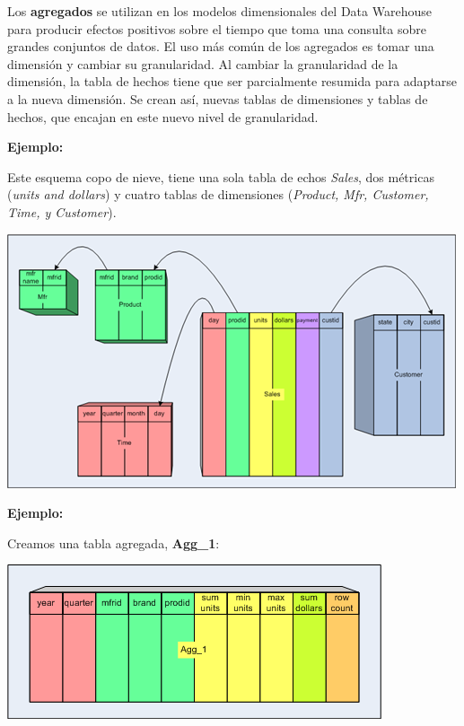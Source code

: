 \documentclass{fancyslides}
\begin{document}
\begin{frame}
\end{frame}

\begin{frame}
\misc
{
Los \textbf{agregados} se utilizan en los modelos dimensionales del Data Warehouse para producir efectos positivos sobre el tiempo que toma una consulta sobre grandes conjuntos de datos. El uso más común de los agregados es tomar una dimensión y cambiar su granularidad.
Al cambiar la granularidad de la dimensión, la tabla de hechos tiene que ser parcialmente resumida para adaptarse a la nueva dimensión. Se crean así, nuevas tablas de dimensiones y tablas de hechos, que encajan en este nuevo nivel de granularidad. 
}
\end{frame}

\begin{frame}
\misc
{
\textbf{Ejemplo:}

Este esquema copo de nieve, tiene una sola tabla de echos \textit{Sales}, dos métricas (\textit{units and dollars}) y cuatro tablas de dimensiones (\textit{Product, Mfr, Customer, Time, y Customer}).

\begin{center}
\includegraphics[scale=0.4]{aggregate_tables_1}
\end{center}
}
\end{frame}

\begin{frame}
\misc
{
\textbf{Ejemplo:}

Creamos una tabla agregada, \textbf{Agg\_1}:
 
\begin{center}
\includegraphics[scale=0.5]{aggregate_tables_2}
\end{center}
}
\end{frame}
\end{document}
